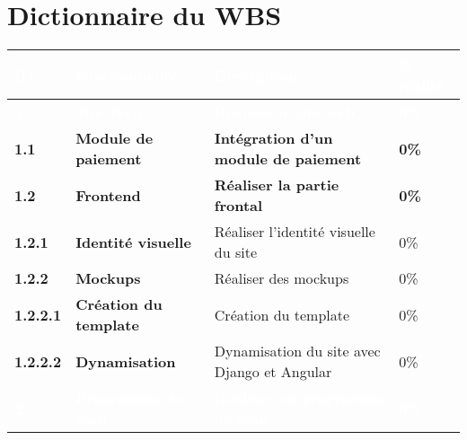 \section{Dictionnaire du WBS}
\footnotesize
\begin{supertabular}{|p{2.8cm} p{6cm}|p{5cm}|R{2cm}|}
  \hline
  \textcolor{white}{\textbf{ID}} & \textcolor{white}{\textbf{Fonctionnalité}} & \textcolor{white}{\textbf{Description}} & \textcolor{white}{\textbf{\% réalisé}} \\
  \hline
  \hline


  \textcolor{white}{\textbf{1}} & \textcolor{white}{\textbf{Site Web}} & \textcolor{white}{\textbf{Réaliser le site web}} & \textcolor{white}{\textbf{0\%}} \\
  \hline

  \textbf{1.1}  & \textbf{Module de paiement} & \textbf{Intégration d'un module de paiement} & \textbf{0\%} \\
  \hline

  \textbf{1.2}  & \textbf{Frontend} & \textbf{Réaliser la partie frontal} & \textbf{0\%} \\
  \hline

  \hspace{6pt}
  \textbf{1.2.1}  & \textbf{Identité visuelle} & Réaliser l'identité visuelle du site & 0\% \\
  \hline

  \hspace{6pt}
  \textbf{1.2.2}  & \textbf{Mockups} & Réaliser des mockups & 0\% \\
  \hline

  \hspace{12pt}
  \textbf{1.2.2.1}  & \textbf{Création du template} & Création du template & 0\% \\
  \hline

  \hspace{12pt}
  \textbf{1.2.2.2}  & \textbf{Dynamisation} & Dynamisation du site avec Django et Angular & 0\% \\
  \hline




  \textcolor{white}{\textbf{2}}  & \textcolor{white}{\textbf{Programme de scan}} & \textcolor{white}{\textbf{Réaliser un programme de scan}} & \textcolor{white}{\textbf{0\%}} \\
  \hline


\end{supertabular}
